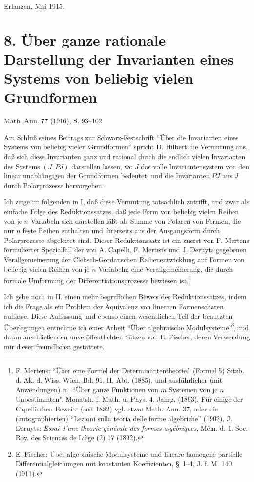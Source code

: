 \documentclass[11pt]{article}
\begin{document}
Erlangen, Mai 1915.

\clearpage
\section*{8. Über ganze rationale Darstellung der Invarianten eines Systems von beliebig vielen Grundformen}
\begin{center}
Math. Ann. 77 (1916), S. 93--102
\end{center}

Am Schluß seines Beitrags zur Schwarz-Festschrift ``Über die Invarianten eines Systems von beliebig vielen Grundformen'' spricht D. Hilbert die Vermutung aus, daß sich diese Invarianten ganz und rational durch die endlich vielen Invarianten des Systems $(J,PJ)$ darstellen lassen, wo $J$ das volle Invariantensystem von den linear unabhängigen der Grundformen bedeutet, und die Invarianten $PJ$ aus $J$ durch Polarprozesse hervorgehen.

Ich zeige im folgenden in I, daß diese Vermutung tatsächlich zutrifft, und zwar als einfache Folge des Reduktionssatzes, daß jede Form von beliebig vielen Reihen von je $n$ Variabeln sich darstellen läßt als Summe von Polaren von Formen, die nur $n$ feste Reihen enthalten und ihrerseits aus der Ausgangsform durch Polarprozesse abgeleitet sind. Dieser Reduktionssatz ist ein zuerst von F. Mertens formulierter Spezialfall der von A. Capelli, F. Mertens und J. Deruyts gegebenen Verallgemeinerung der Clebsch-Gordanschen Reihenentwicklung auf Formen von beliebig vielen Reihen von je $n$ Variabeln; eine Verallgemeinerung, die durch formale Umformung der Differentiationsprozesse bewiesen ist.\footnote{F. Mertens: ``Über eine Formel der Determinantentheorie.'' (Formel 5) Sitzb. d. Ak. d. Wiss. Wien, Bd. 91, II. Abt. (1885), und ausführlicher (mit Anwendungen) in: ``Über ganze Funktionen von $m$ Systemen von je $n$ Unbestimmten''. Monatsh. f. Math. u. Phys. 4. Jahrg. (1893). Für einige der Capellischen Beweise (seit 1882) vgl. etwa: Math. Ann. 37, oder die (autographierten) ``Lezioni sulla teoria delle forme algebriche'' (1902). J. Deruyts: \emph{Essai d'une theorie générale des formes algébriques}, Mém. d. 1. Soc. Roy. des Sciences de Liège (2) 17 (1892).}

Ich gebe noch in II. einen mehr begrifflichen Beweis des Reduktionssatzes, indem ich die Frage als ein Problem der Äquivalenz von linearen Formenscharen auffasse. Diese Auffassung und ebenso einen wesentlichen Teil der benutzten Überlegungen entnehme ich einer Arbeit ``Über algebraische Modulsysteme''\footnote{E. Fischer: Über algebraische Modulsysteme und lineare homogene partielle Differentialgleichungen mit konstanten Koeffizienten, \S\ 1--4, J. f. M. 140 (1911).} und daran anschließenden unveröffentlichten Sätzen von E. Fischer, deren Verwendung mir dieser freundlichst gestattete.
\end{document}
